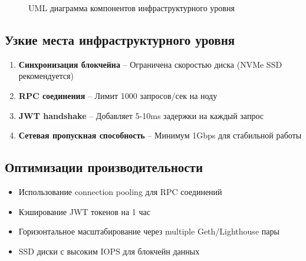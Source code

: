 \documentclass[a4paper,11pt]{article}
\begin{document}
\begin{figure}[H]
\caption{UML диаграмма компонентов инфраструктурного уровня}
\end{figure}

\subsection{Узкие места инфраструктурного уровня}

\begin{enumerate}
    \item \textbf{Синхронизация блокчейна} -- Ограничена скоростью диска (NVMe SSD рекомендуется)
    \item \textbf{RPC соединения} -- Лимит 1000 запросов/сек на ноду
    \item \textbf{JWT handshake} -- Добавляет 5-10ms задержки на каждый запрос
    \item \textbf{Сетевая пропускная способность} -- Минимум 1Gbps для стабильной работы
\end{enumerate}

\subsection{Оптимизации производительности}

\begin{itemize}
    \item Использование connection pooling для RPC соединений
    \item Кэширование JWT токенов на 1 час
    \item Горизонтальное масштабирование через multiple Geth/Lighthouse пары
    \item SSD диски с высоким IOPS для блокчейн данных
\end{itemize}
\end{document}
